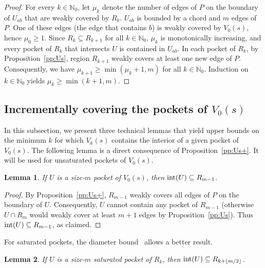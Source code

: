 \documentclass[12pt]{article}
\newcommand{\floor}[1]{{\lfloor #1 \rfloor}}
\newtheorem{lemma}{Lemma}
\begin{document}
\begin{proof}
  For every $k\in \mathbb{N}_0$, let $\mu_k$ denote the number of edges of $P$ on the boundary of $U_{ab}$ that are weakly covered by $R_k$.
$U_{ab}$ is bounded by a chord and $m$ edges of $P$.
One of these edges (the edge that contains $b$) is weakly covered by $V_0(s)$,
  hence $\mu_0\geq 1$.
Since $R_k\subseteq R_{k+1}$ for all $k\in \mathbb{N}_0$,
  $\mu_k$ is monotonically increasing, and every pocket of $R_k$
  that intersects $U$ is contained in $U_{ab}$.
In each pocket of $R_k$, by Proposition~\ref{pp:Us}, region $R_{k+1}$ weakly covers at least one new edge of $P$.
Consequently, we have $\mu_{k+1}\geq \min(\mu_k+1,m)$ for all $k\in \mathbb{N}_0$.
Induction on $k\in \mathbb{N}_0$ yields $\mu_k\geq \min(k+1,m)$.
\end{proof}

\subsection{Incrementally covering the pockets of $V_0(s)$}

In this subsection, we present three technical lemmas that yield upper
bounds on the minimum $k$ for which $V_k(s)$ contains the interior of
a given pocket of $V_0(s)$.
The following lemma is a direct consequence of Proposition~\ref{pp:Us+}.
It will be used for unsaturated pockets of $V_0(s)$.

\begin{lemma}\label{lem:allpockets}
If $U$ is a size-$m$ pocket of $V_0(s)$, then ${\rm int}(U)\subseteq R_{m-1}$.
\end{lemma}

\begin{proof}
By Proposition~\ref{pp:Us+}, $R_{m-1}$ weakly covers all edges of $P$ on the boundary of $U$.
Consequently, $U$ cannot contain any pocket of $R_{m-1}$ (otherwise $U\cap R_m$ would weakly
cover at least $m+1$ edges by Proposition~\ref{pp:Us}).
Thus ${\rm int}(U)\subseteq R_{m-1}$, as claimed.
\end{proof}

For saturated pockets, the diameter bound~\cite{Us} allows a better result.

\begin{lemma} \label{lem:saturated}
If $U$ is a size-$m$ saturated pocket of $R_k$,
then ${\rm int}(U)\subseteq R_{k+\floor{m/2}}$.
\end{lemma}
\end{document}
